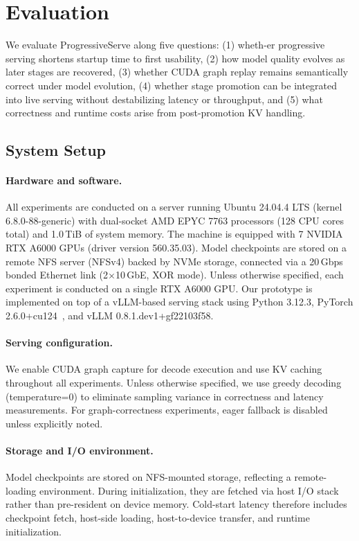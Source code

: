\documentclass[sigplan,anonymous,review,nonacm]{acmart}
\begin{document}
\section{Evaluation}

We evaluate ProgressiveServe along five questions: (1) wheth-er progressive serving shortens startup time to first usability, (2) how model quality evolves as later stages are recovered, (3) whether CUDA graph replay remains semantically correct under model evolution, (4) whether stage promotion can be integrated into live serving without destabilizing latency or throughput, and (5) what correctness and runtime costs arise from post-promotion KV handling.


\subsection{System Setup}
\label{sec:system-setup}

\paragraph{Hardware and software.}
All experiments are conducted on a server running Ubuntu 24.04.4 LTS (kernel 6.8.0-88-generic) with dual-socket AMD EPYC 7763 processors (128 CPU cores total) and 1.0\,TiB of system memory. The machine is equipped with 7 NVIDIA RTX A6000 GPUs (driver version 560.35.03). Model checkpoints are stored on a remote NFS server (NFSv4) backed by NVMe storage, connected via a 20\,Gbps bonded Ethernet link (2$\times$10\,GbE, XOR mode). Unless otherwise specified, each experiment is conducted on a single RTX A6000 GPU. Our prototype is implemented on top of a vLLM-based serving stack using Python 3.12.3, PyTorch 2.6.0+cu124~\cite{pytorch2}, and vLLM 0.8.1.dev1+gf22103f58.

\paragraph{Serving configuration.}
We enable CUDA graph capture for decode execution and use KV caching throughout all experiments. 
Unless otherwise specified, we use greedy decoding (temperature=0) to eliminate sampling variance in correctness and latency measurements. 
For graph-correctness experiments, eager fallback is disabled unless explicitly noted.

\paragraph{Storage and I/O environment.}
Model checkpoints are stored on NFS-mounted storage, reflecting a remote-loading environment. During initialization, they are fetched via host I/O stack rather than pre-resident on device memory. Cold-start latency therefore includes checkpoint fetch, host-side loading, host-to-device transfer, and runtime initialization.
\end{document}

